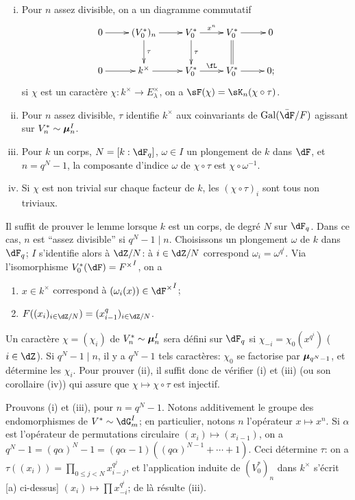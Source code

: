 \begin{lemma_}\label{VI:4-9}
\begin{enumerate}[(i)]
  \item Pour $n$ assez divisible, on a un diagramme commutatif 
    \[\xymatrix{
      0 \ar[r] 
        & (V_0^\ast)_n \ar[r] \ar[d]^-\tau 
        & V_0^\ast \ar[r]^-{x^n} \ar[d]^-\tau 
        & V_0^\ast \ar[r] \ar@{=}[d] 
        & 0 \\
      0 \ar[r] 
        & k^\times \ar[r] 
        & V_0^\ast \ar[r]^-\fL 
        & V_0^\ast \ar[r] 
        & 0 \text{;} 
    }\]
    si $\chi$ est un caractère $\chi:k^\times \to E_\lambda^\times$, on a 
    $\sF(\chi) = \sK_n(\chi\circ\tau)$. 
  \item Pour $n$ assez divisible, $\tau$ identifie $k^\times$ aux coinvariants 
    de $\gal(\bar\dF/F)$ agissant sur $V_n^\ast\sim {\bm\mu}_n^I$. 
  \item Pour $k$ un corps, $N=[k:\dF_q]$, $\omega\in I$ un plongement de $k$ 
    dans $\dF$, et $n=q^N-1$, la composante d'indice $\omega$ de 
    $\chi\circ\tau$ est $\chi\circ \omega^{-1}$. 
  \item Si $\chi$ est non trivial sur chaque facteur de $k$, les 
    $(\chi\circ \tau)_i$ sont tous non triviaux. 
\end{enumerate}
\end{lemma_}

Il suffit de prouver le lemme lorsque $k$ est un corps, de degré $N$ sur 
$\dF_q$. Dans ce cas, $n$ est ``assez divisible'' si $q^N-1\mid n$. 
Choisissons un plongement $\omega$ de $k$ dans $\dF_q$; $I$ s'identifie alors 
à $\dZ/N$: à $i\in \dZ/N$ correspond $\omega_i=\omega^{q^i}$. Via 
l'isomorphisme $V_0^\ast(\dF) = {F^\times}^I$, on a 
\begin{enumerate}[\indent a)]
  \item $x\in k^\times$ correspond à $(\omega_i(x))\in {\dF^\times}^I$; 
  \item $F((x_i)_{i\in \dZ/N})=(x_{i-1}^q)_{i\in \dZ/N}$. 
\end{enumerate}

Un caractère $\chi=(\chi_i)$ de $V_n^\ast\sim {\bm\mu}_n^I$ sera défini sur 
$\dF_q$ si $\chi_{-i} =\chi_0(x^{q^i})$ ($i\in \dZ$). Si $q^N-1\mid n$, il y a 
$q^N-1$ tels caractères: $\chi_0$ se factorise par ${\bm\mu}_{q^N-1}$, et 
détermine les $\chi_i$. Pour prouver (ii), il suffit donc de vérifier (i) 
et (iii) (ou son corollaire (iv)) qui assure que $\chi\mapsto \chi\circ \tau$ 
est injectif. 

Prouvons (i) et (iii), pour $n=q^N-1$. Notons additivement le groupe des 
endomorphismes de $V^\ast\sim \dG_m^I$; en particulier, notons $n$ 
l'opérateur $x\mapsto x^n$. Si $\alpha$ est l'opérateur de permutations 
circulaire $(x_i)\mapsto (x_{i-1})$, on a 
$q^N-1=(q\alpha)^N-1 = (q\alpha-1)((q\alpha)^{N-1}+\cdots + 1)$. Ceci 
détermine $\tau$: on a $\tau((x_i)) = \prod_{0\leqslant j<N} x_{i-j}^{q^j}$, 
et l'application induite de $(V_0^\ast)_n$ dans $k^\times$ s'écrit [a) 
ci-dessus] $(x_i)\mapsto \prod x_{-i}^{q^i}$; de là résulte (iii). 





